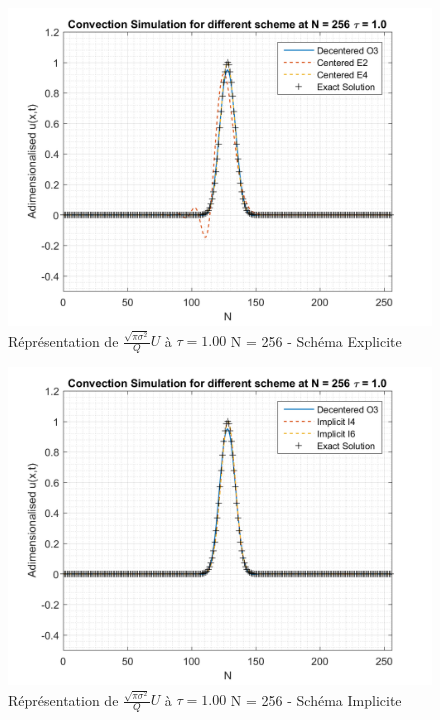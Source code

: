 \documentclass{article}
\begin{document}
\begin{figure}[H]
    \centering
    \includegraphics[scale=0.45]{img/fig4d1.png}
    \caption{Réprésentation de $\frac{\sqrt{\pi \sigma^2}}{Q} U$ à $\tau = 1.00$ N = 256 - Schéma Explicite}
    \label{fig4d1}
\end{figure}
\begin{figure}[H]
    \centering
    \includegraphics[scale=0.45]{img/fig4d2.png}
    \caption{Réprésentation de $\frac{\sqrt{\pi \sigma^2}}{Q} U$ à $\tau = 1.00$ N = 256 - Schéma Implicite}
    \label{fig4d2}
\end{figure}
\end{document}
